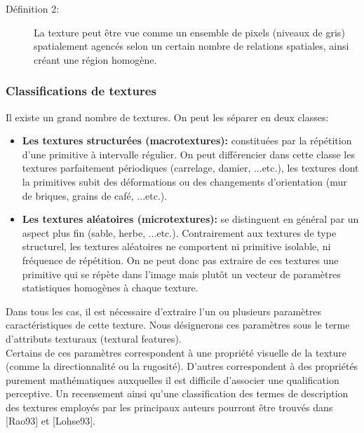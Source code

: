 \begin{description}
	\item[Définition 2:] 	
	La texture peut être vue comme un ensemble de pixels (niveaux de gris) spatialement agencés selon un certain nombre de relations spatiales, ainsi créant une région homogène.
\end{description}

\subsubsection{Classifications de textures}
Il existe un grand nombre de textures. On peut les séparer en deux classes:
\begin{itemize}
	\item \textbf{Les textures structurées (macrotextures):} constituées par la répétition d’une primitive à intervalle régulier. On peut différencier dans cette classe les textures parfaitement périodiques (carrelage, damier, ...etc.), les textures dont la primitives subit des déformations ou des changements d'orientation (mur de briques, grains de café, ...etc.).
	
	\item \textbf{Les textures aléatoires (microtextures):} se distinguent en général par un aspect plus fin (sable, herbe, ...etc.). Contrairement aux textures de type structurel, les textures aléatoires ne comportent ni primitive isolable, ni fréquence de répétition. On ne peut donc pas extraire de ces textures une primitive qui se répète dans l’image mais plutôt un vecteur de paramètres statistiques homogènes à chaque texture.
\end{itemize}

Dans tous les cas, il est nécessaire d'extraire l'un ou plusieurs paramètres caractéristiques de cette texture. Nous désignerons ces paramètres sous le terme d’attributs texturaux (textural features).\\

Certains de ces paramètres correspondent à une propriété visuelle de la texture (comme la directionnalité ou la rugosité). D'autres correspondent à des propriétés purement mathématiques auxquelles il est difficile d'associer une qualification perceptive.
Un recensement ainsi qu'une classification des termes de description des textures employés par les principaux auteurs pourront être trouvés dans [Rao93] et [Lohse93].\\

